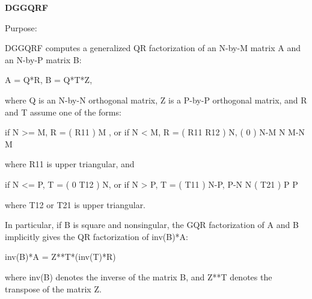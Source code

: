 {\bfseries D\+G\+G\+Q\+R\+F} 

 \begin{DoxyParagraph}{Purpose\+: }
\begin{DoxyVerb} DGGQRF computes a generalized QR factorization of an N-by-M matrix A
 and an N-by-P matrix B:

             A = Q*R,        B = Q*T*Z,

 where Q is an N-by-N orthogonal matrix, Z is a P-by-P orthogonal
 matrix, and R and T assume one of the forms:

 if N >= M,  R = ( R11 ) M  ,   or if N < M,  R = ( R11  R12 ) N,
                 (  0  ) N-M                         N   M-N
                    M

 where R11 is upper triangular, and

 if N <= P,  T = ( 0  T12 ) N,   or if N > P,  T = ( T11 ) N-P,
                  P-N  N                           ( T21 ) P
                                                      P

 where T12 or T21 is upper triangular.

 In particular, if B is square and nonsingular, the GQR factorization
 of A and B implicitly gives the QR factorization of inv(B)*A:

              inv(B)*A = Z**T*(inv(T)*R)

 where inv(B) denotes the inverse of the matrix B, and Z**T denotes the
 transpose of the matrix Z.\end{DoxyVerb}
 
\end{DoxyParagraph}

